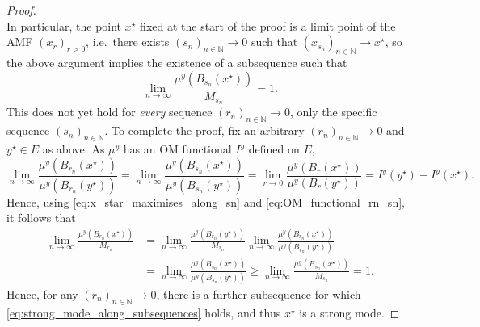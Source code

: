 \documentclass[10pt,a4paper]{amsart}
\newcommand*{\Naturals}{\mathbb{N}}
\newcommand*{\cball}[2]{B_{#2}(#1)}
\renewcommand*{\geq}{\geqslant}
\begin{document}
\begin{proof}
\begin{equation*}
	\end{equation*}
	In particular, the point $x^{\star}$ fixed at the start of the proof is a limit point of the AMF $(x_r)_{r > 0}$, i.e.\ there exists $(s_n)_{n \in \Naturals} \to 0$ such that $(x_{s_n})_{n \in \Naturals} \to x^{\star}$, so the above argument implies the existence of a subsequence such that
	\begin{equation} \label{eq:x_star_maximises_along_sn}
		\lim_{n \to \infty} \frac{\mu^y(\cball{x^{\star}}{s_n})}{M_{s_n}} = 1.
	\end{equation}
	This does not yet hold for \emph{every} sequence $(r_n)_{n \in \Naturals} \to 0$, only the specific sequence $(s_n)_{n \in \Naturals}$.
	To complete the proof, fix an arbitrary $(r_n)_{n \in \Naturals} \to 0$ and $y^{\star} \in E$ as above.
	As $\mu^y$ has an OM functional $I^y$ defined on $E$,
	\begin{equation} \label{eq:OM_functional_rn_sn}
		\lim_{n \to \infty} \frac{\mu^{y}(\cball{x^{\star}}{r_n})}{\mu^{y}(\cball{y^{\star}}{r_n})} = 
		\lim_{n \to \infty} \frac{\mu^{y}(\cball{x^{\star}}{s_n})}{\mu^{y}(\cball{y^{\star}}{s_n})} = 
		\lim_{r \to 0} \frac{\mu^y(\cball{x^{\star}}{r})}{\mu^y(\cball{y^{\star}}{r})} = I^y(y^{\star}) - I^y(x^{\star}).
	\end{equation}
	Hence, using \eqref{eq:x_star_maximises_along_sn} and \eqref{eq:OM_functional_rn_sn}, it follows that
	\begin{align*}
		\lim_{n \to \infty} \frac{\mu^{y}(\cball{x^{\star}}{r_n})}{M_{r_n}} 
		&= \lim_{n \to \infty} \frac{\mu^{y}(\cball{y^{\star}}{r_n})}{M_{r_n}} \lim_{n \to \infty} \frac{\mu^{y}(\cball{x^{\star}}{r_n})}{\mu^{y}(\cball{y^{\star}}{r_n})} \\
		&= \lim_{n \to \infty} \frac{\mu^{y}(\cball{x^{\star}}{s_n})}{\mu^{y}(\cball{y^{\star}}{s_n})}
		\geq \lim_{n \to \infty} \frac{\mu^{y}(\cball{x^{\star}}{s_n})}{M_{s_n}} = 1.
	\end{align*}
	Hence, for any $(r_n)_{n \in \Naturals} \to 0$, there is a further subsequence for which \eqref{eq:strong_mode_along_subsequences} holds, and thus $x^{\star}$ is a strong mode.
\end{proof}
\end{document}
